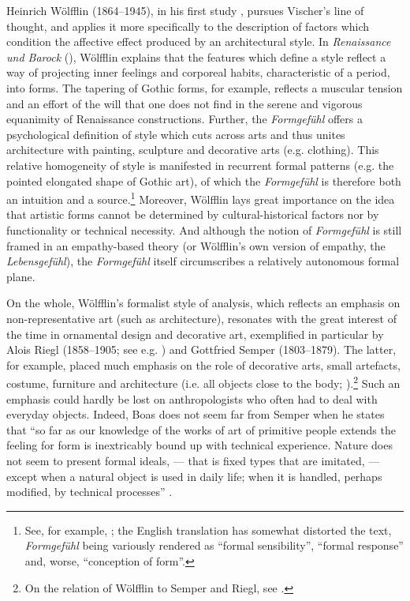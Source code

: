 \documentclass[output=paper]{langscibook}
\begin{document}
Heinrich Wölfflin (1864--1945), in his first study \citet{Wolfflin1886}, pursues Vischer's line of thought, and applies it more specifically to the description of factors which condition the affective effect produced by an architectural style. In \emph{Renaissance und Barock} (\citeyear{Wolfflin1888}), Wölfflin explains that the features which define a style reflect a way of projecting inner feelings and corporeal habits, characteristic of a period, into forms. The tapering of Gothic forms, for example, reflects a muscular tension and an effort of the will that one does not find in the serene and vigorous equanimity of Renaissance  constructions. Further, the \emph{Formgefühl} offers a psychological definition of style which cuts across arts and thus unites architecture with painting, sculpture and decorative arts (e.g. clothing). This relative homogeneity of style is manifested in recurrent formal patterns (e.g. the pointed elongated shape of Gothic art), of which the \emph{Formgefühl} is therefore both an intuition and a source.\footnote{See, for example, \citet[chap. 3]{Wolfflin1888}; the English translation has somewhat distorted the text, \emph{Formgefühl} being variously rendered as ``formal sensibility'', ``formal response'' and, worse, ``conception of form''.} Moreover, Wölfflin lays great importance on the idea that artistic forms cannot be determined by cultural-historical factors nor by functionality or technical necessity. And although the notion of \emph{Formgefühl} is still framed in an empathy-based theory (or Wölfflin's own version of empathy, the \emph{Lebensgefühl}), the \emph{Formgefühl} itself circumscribes a relatively autonomous formal plane.

\largerpage 
On the whole, Wölfflin's formalist style of analysis, which reflects an emphasis on non-representative art (such as architecture), resonates with the great interest of the time in ornamental design and decorative art, exemplified in particular by Alois Riegl (1858--1905; see e.g. \citealt{Riegl1893}) and Gottfried Semper (1803--1879). The latter, for example, placed much emphasis on the role of decorative arts, small artefacts, costume, furniture and architecture (i.e. all objects close to the body; \citealt{Semper1884}).\footnote{On the relation of Wölfflin to Semper and Riegl, see \citet{Payne2012}.} Such an emphasis could hardly be lost on anthropologists who often had to deal with everyday objects. Indeed, Boas does not seem far from Semper when he states that ``so far as our knowledge of the works of art of primitive people extends the feeling for form is inextricably bound up with technical experience. Nature does not seem to present formal ideals, — that is fixed types that are imitated, — except when a natural object is used in daily life; when it is handled, perhaps modified, by technical processes'' \citep[11]{Boas1927}.
\end{document}
